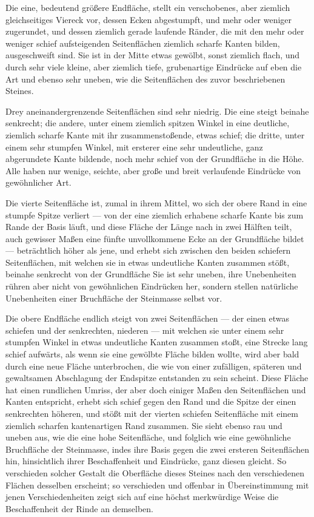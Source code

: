 \documentclass[a4paper, 11pt, oneside, german]{article}
\begin{document}
Die eine, bedeutend größere Endfläche, stellt ein verschobenes, aber ziemlich gleichseitiges Viereck vor, dessen Ecken abgestumpft, und mehr oder weniger zugerundet, und dessen ziemlich gerade laufende Ränder, die mit den mehr oder weniger schief aufsteigenden Seitenflächen ziemlich scharfe Kanten bilden, ausgeschweift sind. Sie ist in der Mitte etwas gewölbt, sonst ziemlich flach, und durch sehr viele kleine, aber ziemlich tiefe, grubenartige Eindrücke auf eben die Art und ebenso sehr uneben, wie die Seitenflächen des zuvor beschriebenen Steines.

Drey aneinandergrenzende Seitenflächen sind sehr niedrig. Die eine steigt beinahe senkrecht; die andere, unter einem ziemlich spitzen Winkel in eine deutliche, ziemlich scharfe Kante mit ihr zusammenstoßende, etwas schief; die dritte, unter einem sehr stumpfen Winkel, mit ersterer eine sehr undeutliche, ganz abgerundete Kante bildende, noch mehr schief von der Grundfläche in die Höhe. Alle haben nur wenige, seichte, aber große und breit verlaufende Eindrücke von gewöhnlicher Art.

Die vierte Seitenfläche ist, zumal in ihrem Mittel, wo sich der obere Rand in eine stumpfe Spitze verliert --- von der eine ziemlich erhabene scharfe Kante bis zum Rande der Basis läuft, und diese Fläche der Länge nach in zwei Hälften teilt, auch gewisser Maßen eine fünfte unvollkommene Ecke an der Grundfläche bildet --- beträchtlich höher als jene, und erhebt sich zwischen den beiden schiefern Seitenflächen, mit welchen sie in etwas undeutliche Kanten zusammen stößt, beinahe senkrecht von der Grundfläche Sie ist sehr uneben, ihre Unebenheiten rühren aber nicht von gewöhnlichen Eindrücken her, sondern stellen natürliche Unebenheiten einer Bruchfläche der Steinmasse selbst vor.

Die obere Endfläche endlich steigt von zwei Seitenflächen --- der einen etwas schiefen und der senkrechten, niederen --- mit welchen sie unter einem sehr stumpfen Winkel in etwas undeutliche Kanten zusammen stoßt, eine Strecke lang schief aufwärts, als wenn sie eine gewölbte Fläche bilden wollte, wird aber bald durch eine neue Fläche unterbrochen, die wie von einer zufälligen, späteren und gewaltsamen Abschlagung der Endspitze entstanden zu sein scheint. Diese Fläche hat einen rundlichen Umriss, der aber doch einiger Maßen den Seitenflächen und Kanten entspricht, erhebt sich schief gegen den Rand und die Spitze der einen senkrechten höheren, und stößt mit der vierten schiefen Seitenfläche mit einem ziemlich scharfen kantenartigen Rand zusammen. Sie sieht ebenso rau und uneben aus, wie die eine hohe Seitenfläche, und folglich wie eine gewöhnliche Bruchfläche der Steinmasse, indes ihre Basis gegen die zwei ersteren Seitenflächen hin, hinsichtlich ihrer Beschaffenheit und Eindrücke, ganz diesen gleicht. So verschieden solcher Gestalt die Oberfläche dieses Steines nach den verschiedenen Flächen desselben erscheint; so verschieden und offenbar in Übereinstimmung mit jenen Verschiedenheiten zeigt sich auf eine höchst merkwürdige Weise die Beschaffenheit der Rinde an demselben.
\end{document}
